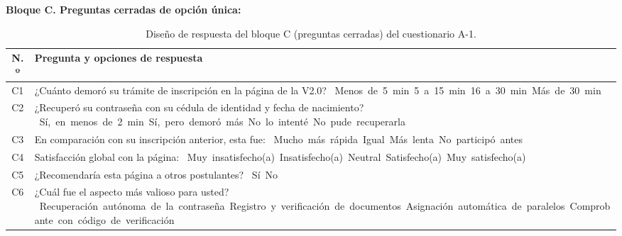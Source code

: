\Needspace{16cm}
\noindent\textbf{Bloque C. Preguntas cerradas de opción única:}

\begin{table}[H]
    \centering
    \caption{Diseño de respuesta del bloque C (preguntas cerradas) del cuestionario A-1.}
    \label{tab:a1_cerradas}
    \renewcommand{\arraystretch}{1.60}
    \begin{tabularx}{\textwidth}{c L}
        \toprule
        \textbf{N.º} & \textbf{Pregunta y opciones de respuesta} \\
        \midrule
        C1 & ¿Cuánto demoró su trámite de inscripción en la página de la V2.0?\newline
            \mbox{\casilla{} Menos de 5 min}\quad \mbox{\casilla{} 5 a 15 min}\quad \mbox{\casilla{} 16 a 30 min}\quad \mbox{\casilla{} Más de 30 min} \\
        \addlinespace
        C2 & ¿Recuperó su contraseña con su cédula de identidad y fecha de nacimiento?\newline
            \mbox{\casilla{} Sí, en menos de 2 min}\quad \mbox{\casilla{} Sí, pero demoró más}\quad \mbox{\casilla{} No lo intenté}\quad \mbox{\casilla{} No pude recuperarla} \\
        \addlinespace
        C3 & En comparación con su inscripción anterior, esta fue:\newline
            \mbox{\casilla{} Mucho más rápida}\quad \mbox{\casilla{} Igual}\quad \mbox{\casilla{} Más lenta}\quad \mbox{\casilla{} No participó antes} \\
        \addlinespace
        C4 & Satisfacción global con la página:\newline
            \mbox{\casilla{} Muy insatisfecho(a)}\quad \mbox{\casilla{} Insatisfecho(a)}\quad \mbox{\casilla{} Neutral}\quad \mbox{\casilla{} Satisfecho(a)}\quad \mbox{\casilla{} Muy satisfecho(a)} \\
        \addlinespace
        C5 & ¿Recomendaría esta página a otros postulantes?\newline
            \mbox{\casilla{} Sí}\quad \mbox{\casilla{} No} \\
        \addlinespace
        C6 & ¿Cuál fue el aspecto más valioso para usted?\newline
            \mbox{\casilla{} Recuperación autónoma de la contraseña}\quad \mbox{\casilla{} Registro y verificación de documentos}\quad \mbox{\casilla{} Asignación automática de paralelos}\quad \mbox{\casilla{} Comprobante con código de verificación} \\
        \bottomrule
    \end{tabularx}
\end{table}

